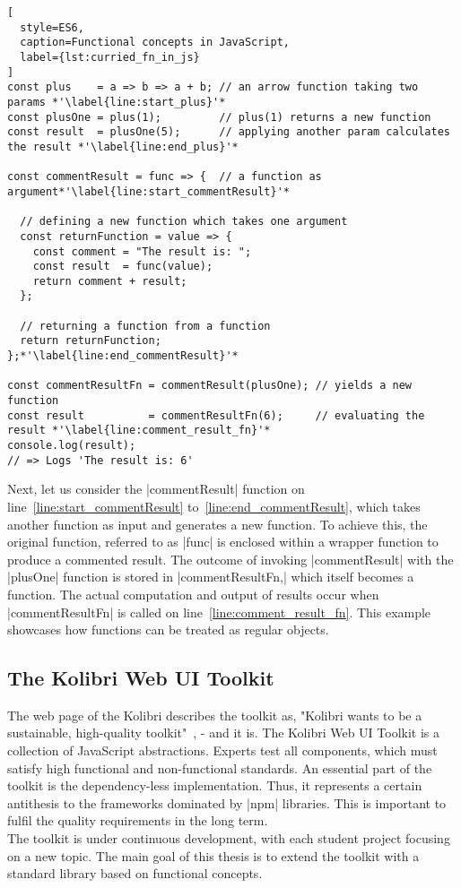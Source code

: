 \begin{lstlisting}[
  style=ES6,
  caption=Functional concepts in JavaScript,
  label={lst:curried_fn_in_js}
]
const plus    = a => b => a + b; // an arrow function taking two params *'\label{line:start_plus}'*
const plusOne = plus(1);         // plus(1) returns a new function 
const result  = plusOne(5);      // applying another param calculates the result *'\label{line:end_plus}'*

const commentResult = func => {  // a function as argument*'\label{line:start_commentResult}'*

  // defining a new function which takes one argument
  const returnFunction = value => {
    const comment = "The result is: ";
    const result  = func(value);
    return comment + result;
  };

  // returning a function from a function
  return returnFunction;
};*'\label{line:end_commentResult}'*

const commentResultFn = commentResult(plusOne); // yields a new function
const result          = commentResultFn(6);     // evaluating the result *'\label{line:comment_result_fn}'*   
console.log(result);
// => Logs 'The result is: 6'
\end{lstlisting}
Next, let us consider the |commentResult| function on
line~\ref{line:start_commentResult} to~\ref{line:end_commentResult}, 
which takes another function
as input and generates a new function. To achieve this, the original function,
referred to as |func| is enclosed within a wrapper function to produce a
commented result. The outcome of invoking |commentResult| with the |plusOne|
function is stored in |commentResultFn,| which itself becomes a function. The
actual computation and output of results occur when |commentResultFn| is
called on line~\ref{line:comment_result_fn}. This example showcases how 
functions can be treated as regular objects.

\subsection{The Kolibri Web UI Toolkit}
\label{sub:The Kolibri Web UI Toolkit}
The web page of the Kolibri describes the toolkit as, "Kolibri wants to be a
sustainable, high-quality toolkit"~\cite{kolibri}, - and it is.
The Kolibri Web UI Toolkit is a collection of JavaScript abstractions. Experts test all
components, which must satisfy high functional and non-functional standards. An
essential part of the toolkit is the dependency-less implementation. Thus, it
represents a certain antithesis to the frameworks dominated by |npm| libraries.
This is important to fulfil the quality requirements in the long term.\\
The toolkit is under continuous development, with each student project focusing
on a new topic. The main goal of this thesis is to extend the toolkit
with a standard library based on functional concepts. 

